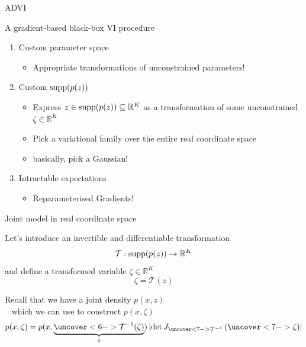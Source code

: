 \documentclass[14pt,dvipsnames]{beamer}
\newcommand{\galert}[1]{\textcolor{PineGreen}{#1}}
\begin{document}
\begin{frame}{ADVI}
	
	A gradient-based black-box VI procedure \pause
	\begin{enumerate}		
		\item \alert{Custom parameter space} \pause
			\begin{itemize}
				\item \galert{Appropriate transformations of unconstrained parameters!} \pause
			\end{itemize}
		\item \alert{Custom $\operatorname{supp}(p(z))$} \pause
			\begin{itemize}
				\item \galert{Express $z \in \operatorname{supp}(p(z)) \subseteq \mathbb R^K$ as a transformation of some unconstrained $\zeta \in \mathbb R^K$} \pause
				\item \galert{Pick a variational family over the entire real coordinate space} \pause
				\item \galert{basically, pick a Gaussian!} \pause
			\end{itemize}
		\item \alert{Intractable expectations} \pause
			\begin{itemize}
				\item \galert{Reparameterised Gradients!} 
			\end{itemize}
	\end{enumerate}
		
\end{frame}

\begin{frame}{Joint model in real coordinate space}

	Let's introduce an invertible and differentiable transformation
	\begin{equation*}
		\mathcal T: \operatorname{supp}(p(z)) \to \mathbb R^K
	\end{equation*} \pause
	 and define a transformed variable $\zeta \in \mathbb R^K$
	\begin{equation*}
		\zeta = \mathcal T(z)
 	\end{equation*} \pause
	
	\vspace{-10pt}	
	
	Recall that we have a joint density $p(x,z)$\\ \pause
	~ which we can use to construct $p(x, \zeta)$ \pause
	\begin{equation*}
		p(x, \zeta) = p(x, \underbrace{\uncover<6->{\inv{\mathcal T}(\zeta)}}_{z}) \djac{\uncover<7->{\inv{\mathcal T}}}{\uncover<7->{\zeta}}
	\end{equation*}
	
\end{frame}
\end{document}
